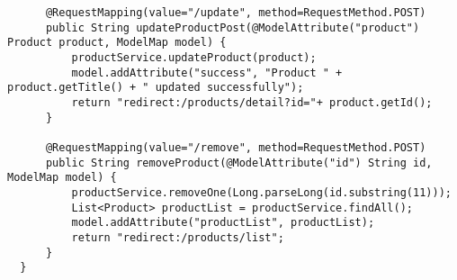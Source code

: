 \documentclass[12pt]{article}
\begin{document}
\begin{lstlisting}
      @RequestMapping(value="/update", method=RequestMethod.POST)
      public String updateProductPost(@ModelAttribute("product") Product product, ModelMap model) {
          productService.updateProduct(product);
          model.addAttribute("success", "Product " + product.getTitle()	+ " updated successfully");
          return "redirect:/products/detail?id="+ product.getId();
      }

      @RequestMapping(value="/remove", method=RequestMethod.POST)
      public String removeProduct(@ModelAttribute("id") String id, ModelMap model) {
          productService.removeOne(Long.parseLong(id.substring(11)));
          List<Product> productList = productService.findAll();
          model.addAttribute("productList", productList);
          return "redirect:/products/list";
      }
  }
\end{lstlisting}















\end{document}
